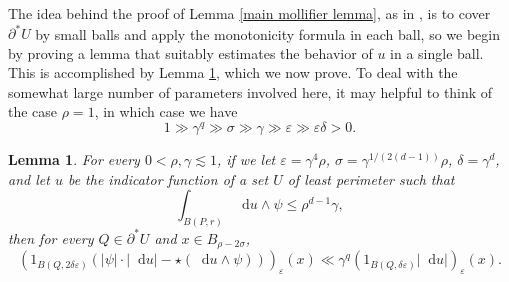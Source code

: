 \documentclass[reqno,10pt]{amsart}
\newcommand*\dif{\mathop{}\!\mathrm{d}}
\newtheorem{lemma}[theorem]{Lemma}
\theoremstyle{definition}
\numberwithin{equation}{section}
\begin{document}
The idea behind the proof of Lemma \ref{main mollifier lemma}, as in \cite{Giusti77}, is to cover $\partial^* U$ by small balls and apply the monotonicity formula in each ball, so we begin by proving a lemma that suitably estimates the behavior of $u$ in a single ball.
This is accomplished by Lemma \ref{mollifier sublemma}, which we now prove.
To deal with the somewhat large number of parameters involved here, it may helpful to think of the case $\rho = 1$, in which case we have
$$1 \gg \gamma^q \gg \sigma \gg \gamma \gg \varepsilon \gg \varepsilon \delta > 0.$$

\begin{lemma}\label{mollifier sublemma}
For every $0 < \rho, \gamma \lesssim 1$, if we let $\varepsilon = \gamma^4 \rho$, $\sigma = \gamma^{1/(2(d - 1))} \rho$, $\delta = \gamma^d$, and let $u$ be the indicator function of a set $U$ of least perimeter such that
\begin{equation}\label{hypothesis on mollifier sublemma}
\int_{B(P, r)} \dif u \wedge \psi \leq \rho^{d - 1} \gamma,
\end{equation}
then for every $Q \in \partial^* U$ and $x \in B_{\rho - 2\sigma}$,
$$(1_{B(Q, 2\delta\varepsilon)}(|\psi| \cdot |\dif u| - \star(\dif u \wedge \psi)))_\varepsilon(x) \ll \gamma^q (1_{B(Q, \delta\varepsilon)} |\dif u|)_\varepsilon(x).$$
\end{lemma}
\end{document}
